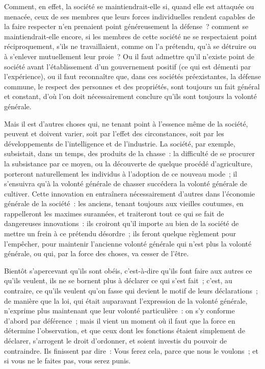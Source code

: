 \documentclass[french,twoside]{book} %
\begin{document}
Comment, en effet, la société se maintiendrait-elle si, quand elle est attaquée ou menacée, ceux de ses membres que leurs forces individuelles rendent capables de la faire respecter n’en prenaient point généreusement la défense ? comment se maintiendrait-elle encore, si les membres de cette société ne se respectaient point réciproquement, s’ils ne travaillaient, comme on l’a prétendu, qu’à se détruire ou à s’enlever mutuellement leur proie ? Ou il faut admettre qu’il n’existe point de société avant l’établissement d’un gouvernement positif (ce qui est démenti par l’expérience), ou il faut reconnaître que, dans ces sociétés préexistantes, la défense commune, le respect des personnes et des propriétés, sont toujours un fait général et constant, d’où l’on doit nécessairement conclure qu’ils sont toujours la volonté générale.\par
Mais il est d’autres choses qui, ne tenant point à l’essence même de la société, peuvent et doivent varier, soit par l’effet des circonstances, soit par les développements de l’intelligence et de l’industrie. La société, par exemple, subsistait, dans un temps, des produits de la chasse : la difficulté de se procurer la subsistance par ce moyen, ou la découverte de quelque procédé d’agriculture, porteront naturellement les individus à l’adoption de ce nouveau mode ; il s’ensuivra qu’à la volonté générale de chasser succédera la volonté générale de cultiver. Cette innovation en entraînera nécessairement d’autres dans l’économie générale de la société : les anciens, tenant toujours aux vieilles coutumes, en rappelleront les maximes surannées, et traiteront tout ce qui se fait de dangereuses innovations : ils croiront qu’il importe au bien de la société de mettre un frein à ce prétendu désordre ; ils feront quelque règlement pour l’empêcher, pour maintenir l’ancienne volonté générale qui n’est plus la volonté générale, ou qui, par la force des choses, va cesser de l’être.\par
Bientôt s’apercevant qu’ils sont obéis, c’est-à-dire qu’ils font faire aux autres ce qu’ils veulent, ils ne se bornent plus à déclarer ce qui s’est fait ; c’est, au contraire, ce qu’ils veulent qu’on fasse qui devient le motif de leurs déclarations ; de manière que la loi, qui était auparavant l’expression de la volonté générale, n’exprime plus maintenant que leur volonté particulière : on s’y conforme d’abord par déférence ; mais il vient un moment où il faut que la force en détermine l’observation, et que ceux dont les fonctions étaient simplement de déclarer, s’arrogent le droit d’ordonner, et soient investis du pouvoir de contraindre. Ils finissent par dire : Vous ferez cela, parce que nous le voulons ; et si vous ne le faites pas, vous serez punis.\par
\end{document}

